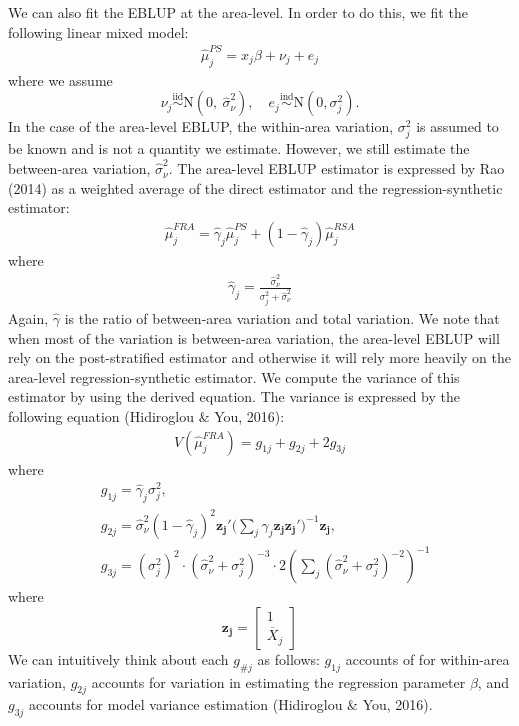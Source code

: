 \documentclass[12pt,twoside]{reedthesis}
\begin{document}
We can also fit the EBLUP at the area-level. In order to do this, we fit the following linear mixed model:
\begin{align}
\hat\mu_{j}^{PS} = x_j \beta + \nu_j + e_j \label{eq:area-mod}
\end{align}
where we assume
\[
 \newcommand\myeq{\stackrel{\mathclap{\normalfont\mbox{s}}}{~}}
\nu_j \stackrel{\text{iid}}{\sim} \text{N}(0,~ \hat\sigma^2_{\nu}), \quad e_{j} \stackrel{\text{ind}}{\sim}\text{N}(0, \sigma^2_j).
\]
In the case of the area-level EBLUP, the within-area variation, \(\sigma^2_j\) is assumed to be known and is not a quantity we estimate. However, we still estimate the between-area variation, \(\hat\sigma_\nu^2\). The area-level EBLUP estimator is expressed by Rao (2014) as a weighted average of the direct estimator and the regression-synthetic estimator:
\begin{align}
\hat \mu_j^{FRA} = \hat\gamma_j \hat\mu_j^{PS} + (1 - \hat\gamma_j) \hat\mu_j^{RSA} \label{eq:eblup-area-weight}
\end{align}
where
\begin{align}
\hat \gamma_j = \frac{\hat \sigma_\nu^2}{\sigma^2_j + \hat\sigma_\nu^2}
\end{align}
Again, \(\hat\gamma\) is the ratio of between-area variation and total variation. We note that when most of the variation is between-area variation, the area-level EBLUP will rely on the post-stratified estimator and otherwise it will rely more heavily on the area-level regression-synthetic estimator. We compute the variance of this estimator by using the derived equation. The variance is expressed by the following equation (Hidiroglou \& You, 2016):
\begin{align}
\hat V(\hat\mu_j^{FRA}) = g_{1j} + g_{2j} + 2g_{3j}
\end{align}
where
\begin{align*}
&g_{1j} = \hat\gamma_j \sigma^2_j, \\
&g_{2j} = \hat\sigma^2_\nu (1 - \hat\gamma_j)^2 \mathbf{z_j'} \Big(\sum_{j} \hat\gamma_j \mathbf{z_j} \mathbf{z_j'}\Big)^{-1} \mathbf{z_j}, \\
&g_{3j} = (\sigma^2_j)^2 \cdot (\hat\sigma^2_\nu + \sigma^2_j)^{-3} \cdot 2(\sum_{j} (\hat\sigma^2_\nu + \sigma^2_j)^{-2})^{-1}
\end{align*}
where
\[
\mathbf{z_j} = \begin{bmatrix}
1 \\ \overline X_j
\end{bmatrix}
\]
We can intuitively think about each \(g_{\#j}\) as follows: \(g_{1j}\) accounts of for within-area variation, \(g_{2j}\) accounts for variation in estimating the regression parameter \(\beta\), and \(g_{3j}\) accounts for model variance estimation (Hidiroglou \& You, 2016).
\end{document}
